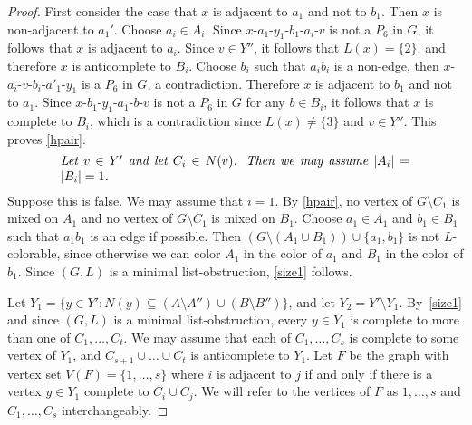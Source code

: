 \documentclass[11pt]{article}
\begin{document}
\begin{proof}
First consider the case that $x$ is adjacent to $a_1$ and not to $b_1$. Then
$x$ is non-adjacent to $a_1'$.
Choose $a_i\in A_i$.
Since $x$-$a_1$-$y_1$-$b_1$-$a_i$-$v$ is not a $P_6$ in $G$, it follows that $x$ is adjacent to $a_i$. Since $v \in Y''$, it follows that $L(x)=\{2\}$,
and therefore $x$ is anticomplete to $B_i$.  
Choose $b_i$ such that $a_ib_i$ is a non-edge, then $x$-$a_i$-$v$-$b_i$-$a'_1$-$y_1$ is a $P_6$ in $G$, a contradiction. 
Therefore $x$ is adjacent to $b_1$ and not to $a_1$. 
Since $x$-$b_1$-$y_1$-$a_1$-$b$-$v$ is not a $P_6$ in $G$ for any $b \in B_i$,
it follows that  $x$ is complete to $B_i$,
which is a contradiction since $L(x) \neq \{3\}$ and $v \in Y''$.
This proves \eqref{hpair}.
\begin{equation}\label{size1}
\begin{minipage}[c]{0.8\textwidth}\em
Let $v \in Y'$ and let $C_i \in N(v)$. Then we may assume $|A_i|=|B_i|=1$.
\end{minipage}
\end{equation}
Suppose this is false.
We may assume that $i=1$. 
By \eqref{hpair}, no vertex of $ G\setminus C_1 $ is mixed on $ A_1 $ and no vertex of $ G\setminus C_1 $ is mixed on $ B_1 $. 
Choose $ a_1 \in A_1 $ and $ b_1 \in B_1 $ such that $a_1b_1$ is an edge if possible.
Then $ (G\setminus (A_1\cup B_1)) \cup \{a_1,b_1\} $ is not $L$-colorable, since otherwise we can color $A_1$ in the color of $a_1$ and $ B_1 $ in the color of $b_1$. 
Since $(G,L)$ is a minimal list-obstruction,
\eqref{size1} follows.
\bigskip

Let $Y_1=\{y \in Y' : N(y) \subseteq (A \setminus A'') \cup (B \setminus B'')\}$,
and let $Y_2=Y' \setminus Y_1$. By~\eqref{size1} and since $(G,L)$
is a minimal list-obstruction, every $y\in Y_1$ is complete to more than one of $C_1, \ldots, C_t$.
We may assume that each of $C_1, \ldots, C_s$
 is complete to some vertex of $Y_1$, and $C_{s+1} \cup \ldots \cup C_t$
is anticomplete to $Y_1$.
Let $F$ be the graph with vertex set $V(F)=\{1, \ldots, s\}$ where
$i$ is adjacent to $j$ if and only if there is a vertex $y \in Y_1$ complete to $C_i \cup C_j$.
We will refer to the vertices of $F$ as $1, \ldots, s$ and $C_1, \ldots, C_s$
interchangeably.


\end{proof}
\end{document}
